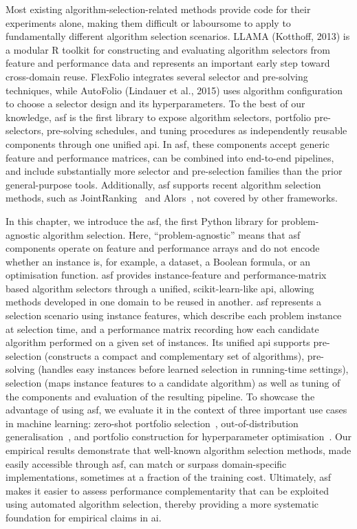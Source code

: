 Most existing algorithm-selection-related methods provide code for their experiments alone, making them difficult or laboursome to apply to fundamentally different algorithm selection scenarios. LLAMA (Kotthoff, 2013) is a modular R toolkit for constructing and evaluating algorithm selectors from feature and performance data and represents an important early step toward cross-domain reuse. FlexFolio integrates several selector and pre-solving techniques, while AutoFolio (Lindauer et al., 2015) uses algorithm configuration to choose a selector design and its hyperparameters. To the best of our knowledge, \gls{asf} is the first library to expose algorithm selectors, portfolio pre-selectors, pre-solving schedules, and tuning procedures as independently reusable components through one unified \gls{api}. In \gls{asf}, these components accept generic feature and performance matrices, can be combined into end-to-end pipelines, and include substantially more selector and pre-selection families than the prior general-purpose tools. Additionally, \gls{asf} supports recent algorithm selection methods, such as JointRanking~\citep{OztEtAl22} and Alors~\citep{MisSeb17}, not covered by other frameworks.

In this chapter, we introduce the \gls{asf}, the first Python library for problem-agnostic algorithm selection.
Here, “problem-agnostic” means that \gls{asf} components operate on feature and performance arrays and do not encode whether an instance is, for example, a dataset, a Boolean formula, or an optimisation function.
\gls{asf} provides instance-feature and performance-matrix based algorithm selectors through a unified, scikit-learn-like \gls{api}, allowing methods developed in one domain to be reused in another.
\gls{asf} represents a selection scenario using instance features, which describe each problem instance at selection time, and a performance matrix recording how each candidate algorithm performed on a given set of instances.
Its unified \gls{api} supports pre-selection (constructs a compact and complementary set of algorithms), pre-solving (handles easy instances before learned selection in running-time settings), selection (maps instance features to a candidate algorithm) as well as tuning of the components and evaluation of the resulting pipeline.
To showcase the advantage of using \gls{asf}, we evaluate it in the context of three important use cases in machine learning:
zero-shot portfolio selection~\citep{OztEtAl22}, out-of-distribution generalisation~\citep{JiaTen25}, and portfolio construction for hyperparameter optimisation~\citep{EggEtAl21}.
Our empirical results demonstrate that well-known algorithm selection methods, made easily accessible through \gls{asf}, can match or surpass domain-specific implementations, sometimes at a fraction of the training cost. Ultimately, \gls{asf} makes it easier to assess performance complementarity that can be exploited using automated algorithm selection, thereby providing a more systematic foundation for empirical claims in \gls{ai}.


